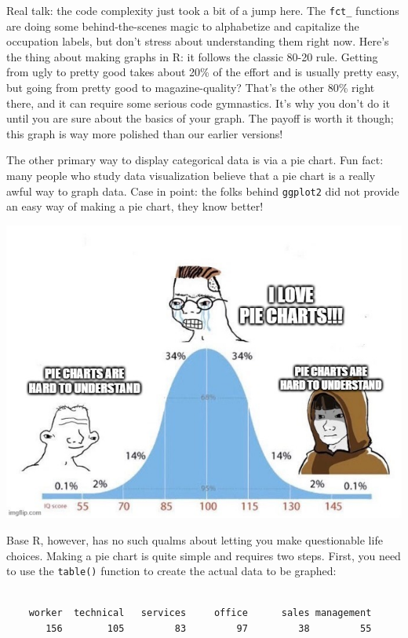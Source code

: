 \documentclass[
  letterpaper,
]{book}
\newenvironment{Shaded}{\begin{snugshade}}{\end{snugshade}}
\newcommand{\FunctionTok}[1]{\textcolor[rgb]{0.28,0.35,0.67}{#1}}
\newcommand{\NormalTok}[1]{\textcolor[rgb]{0.00,0.23,0.31}{#1}}
\newcommand{\OtherTok}[1]{\textcolor[rgb]{0.00,0.23,0.31}{#1}}
\newcommand{\SpecialCharTok}[1]{\textcolor[rgb]{0.37,0.37,0.37}{#1}}
\begin{document}
Real talk: the code complexity just took a bit of a jump here. The
\texttt{fct\_} functions are doing some behind-the-scenes magic to
alphabetize and capitalize the occupation labels, but don't stress about
understanding them right now. Here's the thing about making graphs in R:
it follows the classic 80-20 rule. Getting from ugly to pretty good
takes about 20\% of the effort and is usually pretty easy, but going
from pretty good to magazine-quality? That's the other 80\% right there,
and it can require some serious code gymnastics. It's why you don't do
it until you are sure about the basics of your graph. The payoff is
worth it though; this graph is way more polished than our earlier
versions!

The other primary way to display categorical data is via a pie chart.
Fun fact: many people who study data visualization believe that a pie
chart is a really awful way to graph data. Case in point: the folks
behind \texttt{ggplot2} did not provide an easy way of making a pie
chart, they know better!

\begin{center}
\includegraphics[width=0.5\linewidth,height=\textheight,keepaspectratio]{images/normalpie.jpg}
\end{center}

Base R, however, has no such qualms about letting you make questionable
life choices. Making a pie chart is quite simple and requires two steps.
First, you need to use the \texttt{table()} function to create the
actual data to be graphed:

\begin{Shaded}
\end{Shaded}

\begin{verbatim}

    worker  technical   services     office      sales management 
       156        105         83         97         38         55 
\end{verbatim}
\end{document}
